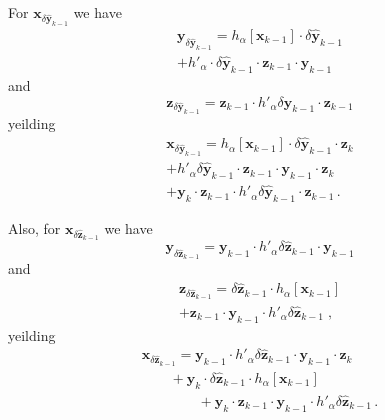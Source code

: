 \documentclass[letterpaper,twocolumn,amsmath,amsfont,amssymb,english,aps,jcp,preprintnumbers,groupaddress,nofootinbib,tightenlines]{revtex4}
\newcommand{\mat}[1]{\boldsymbol{#1}}
\begin{document}
For $\mat{x}_{\delta \widehat{ \mat{y}}_{k-1}}$ we have
\begin{multline}
 \mat{y}_{\delta \widehat{ \mat{y}}_{k-1}} = h_\alpha \left[ \mat{x}_{k-1} \right] \cdot \delta \widehat{\mat{y}}_{k-1} \\ 
                                     + h'_\alpha \cdot \delta \widehat{\mat{y}}_{k-1} \cdot \mat{z}_{k-1} \cdot \mat{y}_{k-1}
\end{multline}
and
\begin{equation}
 \mat{z}_{\delta \widehat{ \mat{y}}_{k-1}} =  \mat{z}_{k-1} \cdot h'_\alpha \delta \widehat{\mat{y}}_{k-1} \cdot \mat{z}_{k-1}
\end{equation}
yeilding 
\begin{multline} 
 \mat{x}_{\delta \widehat{ \mat{y}}_{k-1}} = h_\alpha \left[ \mat{x}_{k-1} \right]  \cdot \delta \widehat{\mat{y}}_{k-1} \cdot \mat{z}_{k} \\  
+  h'_\alpha  \delta \widehat{\mat{y}}_{k-1} \cdot \mat{z}_{k-1} \cdot  \mat{y}_{k-1} \cdot  \mat{z}_{k} \\ 
+ \mat{y}_{k} \cdot \mat{z}_{k-1} \cdot h'_\alpha \delta \widehat{\mat{y}}_{k-1} \cdot \mat{z}_{k-1}  \, .
\end{multline}

Also, for $\mat{x}_{\delta \widehat{ \mat{z}}_{k-1}}$ we have
\begin{equation}
 \mat{y}_{\delta \widehat{ \mat{z}}_{k-1}} =  {\mat{y}}_{k-1} \cdot  h'_\alpha \delta \widehat{ \mat{z}}_{k-1} \cdot  \mat{y}_{k-1} 
\end{equation}
and
\begin{multline}
 \mat{z}_{\delta \widehat{ \mat{z}}_{k-1}} = \delta \widehat{\mat{z}}_{k-1} \cdot   h_\alpha \left[ \mat{x}_{k-1} \right] \\ 
                                     + \mat{z}_{k-1} \cdot {\mat{y}}_{k-1} \cdot h'_\alpha \delta \widehat{\mat{z}}_{k-1}  \; ,
\end{multline}
yeilding 
\begin{multline} 
 \mat{x}_{\delta \widehat{ \mat{z}}_{k-1}} =  {\mat{y}}_{k-1} \cdot  h'_\alpha \delta \widehat{ \mat{z}}_{k-1} \cdot  \mat{y}_{k-1}  \cdot \mat{z}_{k} \\
\qquad + \mat{y}_k \cdot  \delta \widehat{\mat{z}}_{k-1} \cdot   h_\alpha \left[ \mat{x}_{k-1} \right] \\ 
\qquad \qquad +  \mat{y}_{k} \cdot  \mat{z}_{k-1} \cdot {\mat{y}}_{k-1} \cdot h'_\alpha \delta \widehat{\mat{z}}_{k-1} \, .
\end{multline}
\end{document}
